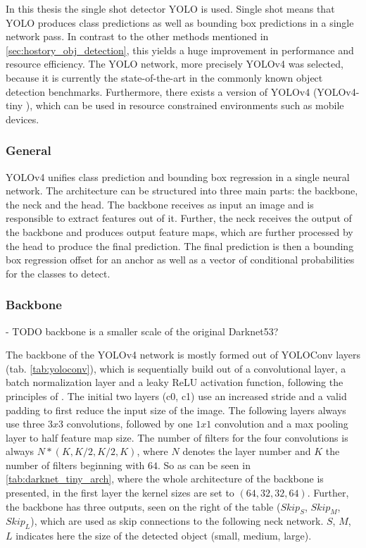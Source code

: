 
In this thesis the single shot detector \ac{YOLO} \cite{yolov1} is used.
Single shot means that \ac{YOLO} produces class predictions as well as bounding box predictions in a single network pass.
In contrast to the other methods mentioned in \ref{sec:hostory_obj_detection}, this yields a huge improvement in performance and resource efficiency.
The \ac{YOLO} network, more precisely \ac{YOLOv4} \cite{yolov4} was selected, because it is currently the state-of-the-art in the commonly known object detection benchmarks.
Furthermore, there exists a version of \ac{YOLOv4} (YOLOv4-tiny \cite{yolov4_tiny}), which can be used in resource constrained environments such as mobile devices.

\subsubsection{General}

\ac{YOLOv4} unifies class prediction and bounding box regression in a single neural network.
The architecture can be structured into three main parts: the backbone, the neck and the head.
The backbone receives as input an image and is responsible to extract features out of it.
Further, the neck receives the output of the backbone and produces output feature maps, which are further processed by the head to produce the final prediction.
The final prediction is then a bounding box regression offset for an anchor as well as a vector of conditional probabilities for the classes to detect.

\subsubsection{Backbone}

- TODO backbone is a smaller scale of the original Darknet53?

The backbone of the \ac{YOLOv4} network is mostly formed out of YOLOConv layers (tab. \ref{tab:yoloconv}), which is sequentially build out of a convolutional layer, a batch normalization layer and a leaky \ac{ReLU} activation function, following the principles of \cite{batchnorm}.
The initial two layers (c0, c1) use an increased stride and a valid padding to first reduce the input size of the image.
The following layers always use three $3x3$ convolutions, followed by one $1x1$ convolution and a max pooling layer to half feature map size.
The number of filters for the four convolutions is always $N * (K, K/2, K/2, K)$, where $N$ denotes the layer number and $K$ the number of filters beginning with $64$.
So as can be seen in \ref{tab:darknet_tiny_arch}, where the whole architecture of the backbone is presented, in the first layer the kernel sizes are set to $(64, 32, 32, 64)$.
Further, the backbone has three outputs, seen on the right of the table ($Skip_S$, $Skip_M$, $Skip_L$), which are used as skip connections to the following neck network.
$S$, $M$, $L$ indicates here the size of the detected object (small, medium, large).

